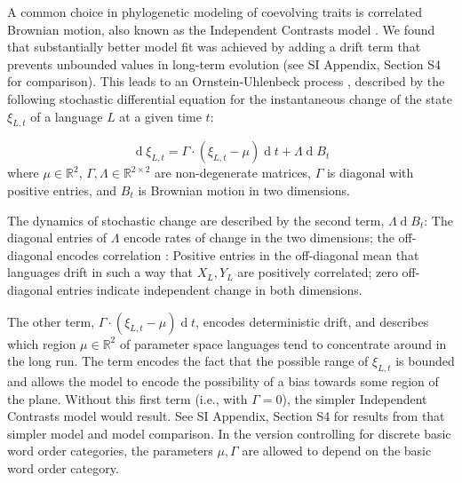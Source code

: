 \documentclass[9pt,twocolumn,twoside,lineno]{pnas-new}
\begin{document}
{%


A common choice in phylogenetic modeling of coevolving traits is correlated Brownian motion, also known as the Independent Contrasts model \citep{felsenstein1973maximum,freckleton2012fast}.
We found that substantially better model fit was achieved by adding a drift term that prevents unbounded values  in long-term evolution (see SI Appendix, Section S4 for comparison).
This leads to an Ornstein-Uhlenbeck process \citep{felsenstein1988phylogenies,hansen1997stabilizing,blackwell2003bayesian}, described by the following stochastic differential equation for the instantaneous change of the state $\xi_{L,t}$ of a language $L$ at a given time $t$:

\begin{equation*}
    \operatorname{d}\xi_{L,t} = \Gamma \cdot (\xi_{L,t}-\mu) \operatorname{d}t + \Lambda \operatorname{d}B_t
\end{equation*}
where $\mu \in \mathbb{R}^2$,  $\Gamma, \Lambda \in \mathbb{R}^{2\times 2}$ are non-degenerate matrices, $\Gamma$ is diagonal with positive entries, and $B_t$ is Brownian motion in two dimensions.

The dynamics of stochastic change are described by the second term, $\Lambda \operatorname{d}B_t$:
The diagonal entries of $\Lambda$ encode rates of change in the two dimensions; the off-diagonal encodes correlation \citep{felsenstein1973maximum,freckleton2012fast}: Positive entries in the off-diagonal mean that languages drift in such a way that $X_L, Y_L$ are positively correlated; zero off-diagonal entries indicate independent change in both dimensions.



The other term, $\Gamma \cdot (\xi_{L,t}-\mu) \operatorname{d}t$, encodes deterministic drift, and describes which region $\mu \in \mathbb{R}^2$ of parameter space languages tend to concentrate around in the long run.
The term encodes the fact that the possible range of $\xi_{L,t}$ is bounded and allows the model to encode the possibility of a bias towards some region of the plane.
Without this first term (i.e., with $\Gamma =0$), the simpler Independent Contrasts model \citep{felsenstein1973maximum,freckleton2012fast} would result. See SI Appendix, Section S4 for results from that simpler model and model comparison.
In the version controlling for discrete basic word order categories, the parameters $\mu, \Gamma$ are allowed to depend on the basic word order category.

}
\end{document}
